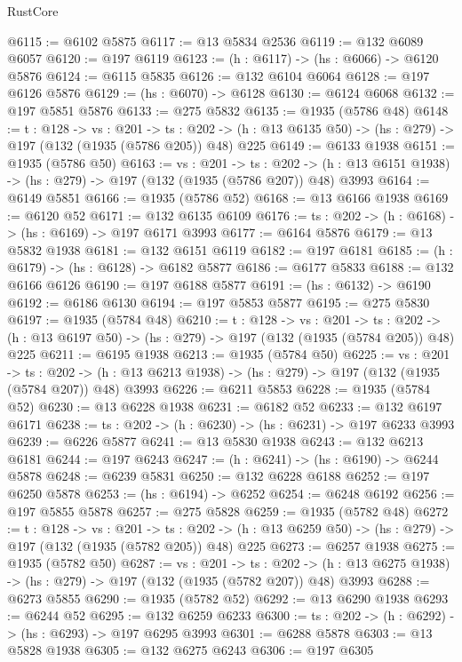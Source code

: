 \begin{lexlean}{RustCore}
\begin{coremodule}
@6115 := @6102 @5875
@6117 := @13 @5834 @2536
@6119 := @132 @6089 @6057
@6120 := @197 @6119
@6123 := (h : @6117) -> (hs : @6066) -> @6120 @5876
@6124 := @6115 @5835
@6126 := @132 @6104 @6064
@6128 := @197 @6126 @5876
@6129 := (hs : @6070) -> @6128
@6130 := @6124 @6068
@6132 := @197 @5851 @5876
@6133 := @275 @5832
@6135 := @1935 (@5786 @48)
@6148 := {t : @128} ->
  {vs : @201} ->
  {ts : @202} -> (h : @13 @6135 @50) -> (hs : @279) -> @197 (@132 (@1935 (@5786 @205)) @48) @225
@6149 := @6133 @1938
@6151 := @1935 (@5786 @50)
@6163 := {vs : @201} ->
  {ts : @202} -> (h : @13 @6151 @1938) -> (hs : @279) -> @197 (@132 (@1935 (@5786 @207)) @48) @3993
@6164 := @6149 @5851
@6166 := @1935 (@5786 @52)
@6168 := @13 @6166 @1938
@6169 := @6120 @52
@6171 := @132 @6135 @6109
@6176 := {ts : @202} -> (h : @6168) -> (hs : @6169) -> @197 @6171 @3993
@6177 := @6164 @5876
@6179 := @13 @5832 @1938
@6181 := @132 @6151 @6119
@6182 := @197 @6181
@6185 := (h : @6179) -> (hs : @6128) -> @6182 @5877
@6186 := @6177 @5833
@6188 := @132 @6166 @6126
@6190 := @197 @6188 @5877
@6191 := (hs : @6132) -> @6190
@6192 := @6186 @6130
@6194 := @197 @5853 @5877
@6195 := @275 @5830
@6197 := @1935 (@5784 @48)
@6210 := {t : @128} ->
  {vs : @201} ->
  {ts : @202} -> (h : @13 @6197 @50) -> (hs : @279) -> @197 (@132 (@1935 (@5784 @205)) @48) @225
@6211 := @6195 @1938
@6213 := @1935 (@5784 @50)
@6225 := {vs : @201} ->
  {ts : @202} -> (h : @13 @6213 @1938) -> (hs : @279) -> @197 (@132 (@1935 (@5784 @207)) @48) @3993
@6226 := @6211 @5853
@6228 := @1935 (@5784 @52)
@6230 := @13 @6228 @1938
@6231 := @6182 @52
@6233 := @132 @6197 @6171
@6238 := {ts : @202} -> (h : @6230) -> (hs : @6231) -> @197 @6233 @3993
@6239 := @6226 @5877
@6241 := @13 @5830 @1938
@6243 := @132 @6213 @6181
@6244 := @197 @6243
@6247 := (h : @6241) -> (hs : @6190) -> @6244 @5878
@6248 := @6239 @5831
@6250 := @132 @6228 @6188
@6252 := @197 @6250 @5878
@6253 := (hs : @6194) -> @6252
@6254 := @6248 @6192
@6256 := @197 @5855 @5878
@6257 := @275 @5828
@6259 := @1935 (@5782 @48)
@6272 := {t : @128} ->
  {vs : @201} ->
  {ts : @202} -> (h : @13 @6259 @50) -> (hs : @279) -> @197 (@132 (@1935 (@5782 @205)) @48) @225
@6273 := @6257 @1938
@6275 := @1935 (@5782 @50)
@6287 := {vs : @201} ->
  {ts : @202} -> (h : @13 @6275 @1938) -> (hs : @279) -> @197 (@132 (@1935 (@5782 @207)) @48) @3993
@6288 := @6273 @5855
@6290 := @1935 (@5782 @52)
@6292 := @13 @6290 @1938
@6293 := @6244 @52
@6295 := @132 @6259 @6233
@6300 := {ts : @202} -> (h : @6292) -> (hs : @6293) -> @197 @6295 @3993
@6301 := @6288 @5878
@6303 := @13 @5828 @1938
@6305 := @132 @6275 @6243
@6306 := @197 @6305

\end{coremodule}
\end{lexlean}
